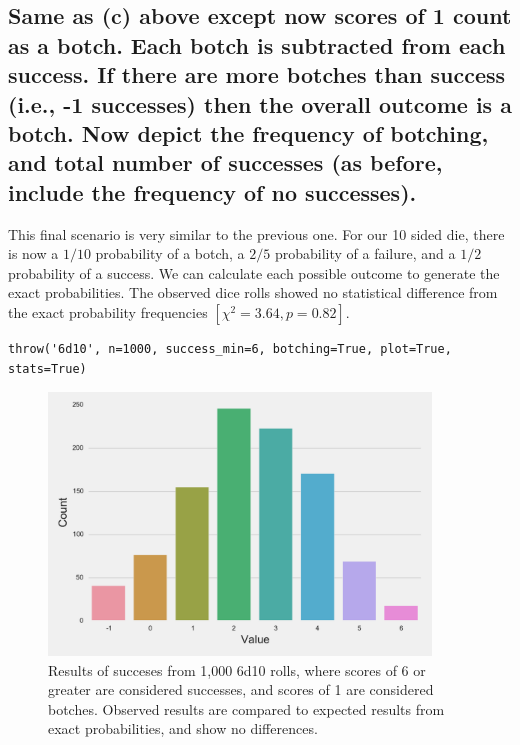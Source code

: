 \documentclass{article}
\begin{document}
\subsection{Same as (c) above except now scores of 1 count as a botch. Each botch is subtracted from each success. If there are more botches than success (i.e., -1 successes) then the overall outcome is a botch. Now depict the frequency of botching, and total number of successes (as before, include the frequency of no successes).}

This final scenario is very similar to the previous one. For our 10 sided die, there is now a $1/10$ probability of a botch, a $2/5$ probability of a failure, and a $1/2$ probability of a success. We can calculate each possible outcome to generate the exact probabilities. The observed dice rolls showed no statistical difference from the exact probability frequencies $[\chi^2=3.64, p=0.82]$.
\\
\begin{lstlisting}
throw('6d10', n=1000, success_min=6, botching=True, plot=True, stats=True)
\end{lstlisting}

\begin{figure}[H]
\begin{floatrow}
\includegraphics[width=4in]{6d10_min6_botching.pdf}
\end{floatrow}
\caption{Results of succeses from 1,000 6d10 rolls, where scores of 6 or greater are considered successes, and scores of 1 are considered botches. Observed results are compared to expected results from exact probabilities, and show no differences.}
\end{figure}
\end{document}
